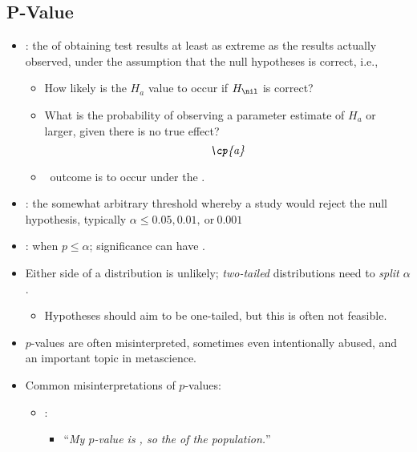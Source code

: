 \begin{itemize}
  \subsection{P-Value}
  \begin{itemize}
    \item {}: the \hyperref[Section: Probability Fundamentals]{} of obtaining test results at least as extreme as the results actually observed, under the assumption that the null hypotheses is correct, i.e.,
      \begin{itemize}
        \item How likely is the \(H_a\) value to occur if \(H_\nil\) is correct?
        \item What is the probability of observing a parameter estimate of \(H_a\) or larger, given there is no true effect?
        \[%
        \emph{\cp{a}}
        \]%
        \item {} \to~outcome is  to occur under the .
      \end{itemize}
    \item {}: the somewhat arbitrary threshold whereby a study would reject the null hypothesis, typically \(\alpha \leq 0.05, 0.01,~\text{or}~0.001\)
    \item {}: when \(p \leq \alpha\); significance can have \hyperref[Subsection: Interpretations of Significance]{}.
    \item Either side of a distribution is unlikely; \emph{two-tailed} distributions need to \emph{split \(\alpha\)}.
      \begin{itemize}
        \item Hypotheses should aim to be one-tailed, but this is often not feasible.
      \end{itemize}
    \item \(p\)-values are often misinterpreted, sometimes even intentionally abused, and an important topic in metascience.
    \item Common misinterpretations of \(p\)-values:
      \begin{itemize}
        \item {}: 
          \begin{itemize}
            \item ``\textit{My \(p\)-value is , so the  of the population.}''

\end{itemize}
\end{itemize}
\end{itemize}
\end{itemize}

